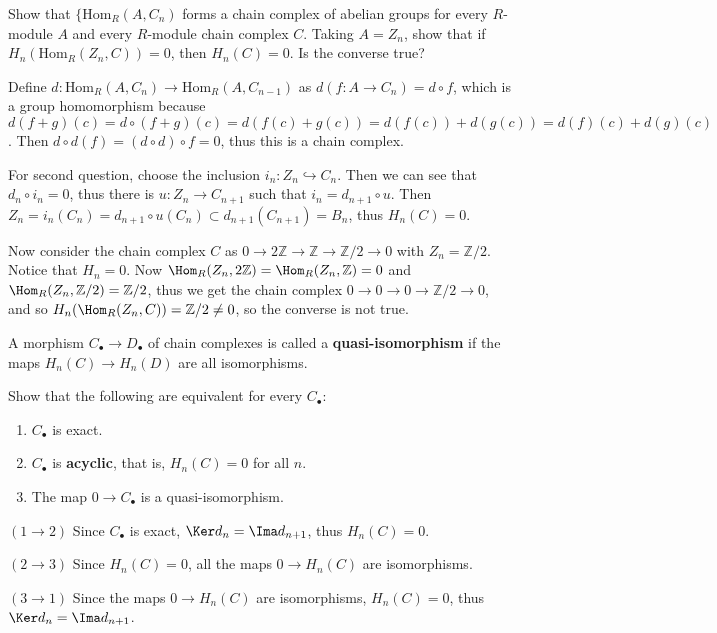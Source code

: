 \begin{exer} Show that $\{\textrm{Hom}_R(A,C_n)$ forms a chain complex of abelian groups for every $R$-module $A$ and every $R$-module chain complex $C$. Taking $A=Z_n$, show that if $H_n(\textrm{Hom}_R(Z_n,C))=0$, then $H_n(C)=0$. Is the converse true?
\end{exer}
\begin{solution} Define $d:\textrm{Hom}_R(A,C_n)\rightarrow \textrm{Hom}_R(A,C_{n-1})$ as $d(f:A\rightarrow C_n)=d\circ f$, which is a group homomorphism because $d(f+g)(c)=d\circ(f+g)(c)=d(f(c)+g(c))=d(f(c))+d(g(c))=d(f)(c)+d(g)(c)$. Then $d\circ d(f)=(d\circ d)\circ f=0$, thus this is a chain complex.

For second question, choose the inclusion $i_n:Z_n\hookrightarrow C_n$. Then we can see that $d_n\circ i_n=0$, thus there is $u:Z_n\rightarrow C_{n+1}$ such that $i_n=d_{n+1}\circ u$. Then $Z_n=i_n(C_n)=d_{n+1}\circ u(C_n)\subset d_{n+1}(C_{n+1})=B_n$, thus $H_n(C)=0$.

Now consider the chain complex $C$ as $0\rightarrow 2\mathbb{Z}\rightarrow \mathbb{Z}\rightarrow \mathbb{Z}/2\rightarrow 0$ with $Z_n=\mathbb{Z}/2$. Notice that $H_n=0$. Now $\Hom_R(Z_n,2\mathbb{Z})=\Hom_R(Z_n,\mathbb{Z})=0$ and $\Hom_R(Z_n,\mathbb{Z}/2)=\mathbb{Z}/2$, thus we get the chain complex $0\rightarrow 0\rightarrow 0\rightarrow \mathbb{Z}/2\rightarrow 0$, and so $H_n(\Hom_R(Z_n,C))=\mathbb{Z}/2\neq 0$, so the converse is not true.
\end{solution}

\begin{defn} A morphism $C_\bullet\rightarrow D_\bullet$ of chain complexes is called a \textbf{quasi-isomorphism} if the maps $H_n(C)\rightarrow H_n(D)$ are all isomorphisms.
\end{defn}

\begin{exer} Show that the following are equivalent for every $C_\bullet$:
\begin{enumerate}
\item $C_\bullet$ is exact.
\item $C_\bullet$ is \textbf{acyclic}, that is, $H_n(C)=0$ for all $n$.
\item The map $0\rightarrow C_\bullet$ is a quasi-isomorphism.
\end{enumerate}
\end{exer}
\begin{solution}
$(1\rightarrow 2)$ Since $C_\bullet$ is exact, $\Ker d_{n}=\Ima d_{n+1}$, thus $H_n(C)=0$.

$(2\rightarrow 3)$ Since $H_n(C)=0$, all the maps $0\rightarrow H_n(C)$ are isomorphisms.

$(3\rightarrow 1)$ Since the maps $0\rightarrow H_n(C)$ are isomorphisms, $H_n(C)=0$, thus $\Ker d_n=\Ima d_{n+1}$.
\end{solution}

